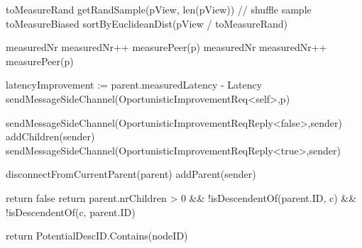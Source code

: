 \begin{algorithm}
\begin{algorithmic}[1]
     \label{alg:memb:passive_view_maint:eval_nodes}
        \State toMeasureRand \asdassign getRandSample(pView, len(pView)) // shuffle sample
        \State toMeasureBiased \asdassign sortByEuclideanDist(pView / toMeasureRand)

        \State measuredNr 
             \label{alg:memb:passive_view_maint:opt_verification_1}
                \State measuredNr++
                \State measurePeer(p)
            \EndIf
        \EndFor
        \State measuredNr 
             \label{alg:memb:passive_view_maint:opt_verification_2}
                \State measuredNr++
                \State measurePeer(p)
            \EndIf
        \EndFor
    \asdend

        \State latencyImprovement := parent.measuredLatency - Latency
            \State sendMessageSideChannel(OportunisticImprovementReq<self>,p)
        \EndIf
    \asdend

            \State sendMessageSideChannel(OportunisticImprovementReqReply<false>,sender)
        \Else
            \State addChildren(sender)
            \State sendMessageSideChannel(OportunisticImprovementReqReply<true>,sender)
        \EndIf
    \asdend

            \State disconnectFromCurrentParent(parent)
            \State addParent(sender)
        \EndIf
    \asdend

            \State return false
        \EndIf
        \State return parent.nrChildren > 0 \&\& !isDescendentOf(parent.ID, c) \&\& !isDescendentOf(c, parent.ID)
    \asdend

        \State return PotentialDescID.Contains(nodeID)
    \asdend

\end{algorithmic}
\end{algorithm}